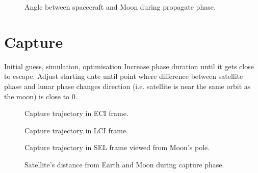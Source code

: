 \begin{figure}
\centering
\def\svgwidth{\figurewidth}

\caption{Angle between spacecraft and Moon during propagate phase.}
\label{fig:Propagate-phase}
\end{figure}


\clearpage

\section{Capture}
Initial guess, simulation, optimisation
Increase phase duration until it gets close to escape.
Adjust starting date until point where difference between satellite phase and lunar phase changes direction (i.e. satellite is near the same orbit as the moon) is close to 0\degrees.

\begin{figure}
\centering
\def\svgwidth{\figurewidth}

\caption{Capture trajectory in ECI frame.}
\label{fig:Capture-3D}
\end{figure}

\begin{figure}
\centering
\def\svgwidth{\figurewidth}

\caption{Capture trajectory in LCI frame.}
\label{fig:Capture-3D-eci}
\end{figure}

\begin{figure}
\centering
\def\svgwidth{\figurewidth}

\caption{Capture trajectory in SEL frame viewed from Moon's pole.}
\label{fig:Capture-3D-sel-above}
\end{figure}

%

\begin{figure}
\centering
\def\svgwidth{\figurewidth}

\caption{Satellite's distance from Earth and Moon during capture phase.}
\label{fig:Capture-dist}
\end{figure}


